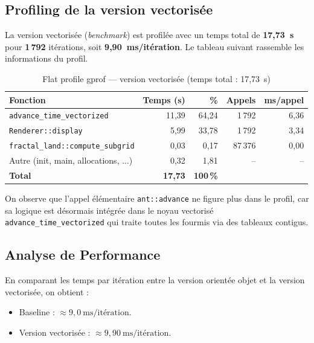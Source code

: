 \documentclass[12pt,a4paper]{article}
\begin{document}
\subsection{Profiling de la version vectorisée}

La version vectorisée (\textit{benchmark}) est profilée avec un temps total de \textbf{17,73~s} pour \textbf{1\,792} itérations, soit \textbf{9,90~ms/itération}. Le tableau suivant rassemble les informations du profil.

\begin{table}[H]
    \centering
    \caption{Flat profile gprof --- version vectorisée (temps total : 17,73~s)}
    \begin{tabular}{lrrrr}
        \toprule
        \textbf{Fonction} & \textbf{Temps (s)} & \textbf{\%} & \textbf{Appels} & \textbf{ms/appel} \\
        \midrule
        \texttt{advance\_time\_vectorized} & 11{,}39 & 64{,}24 & 1\,792 & 6{,}36 \\
        \texttt{Renderer::display} & 5{,}99 & 33{,}78 & 1\,792 & 3{,}34 \\
        \texttt{fractal\_land::compute\_subgrid} & 0{,}03 & 0{,}17 & 87\,376 & 0{,}00 \\
        Autre (init, main, allocations, ...) & 0{,}32 & 1{,}81 & -- & -- \\
        \midrule
        \textbf{Total} & \textbf{17{,}73} & \textbf{100\,\%} & & \\
        \bottomrule
    \end{tabular}
\end{table}

On observe que l'appel élémentaire \texttt{ant::advance} ne figure plus dans le profil, car sa logique est désormais intégrée dans le noyau vectorisé \texttt{advance\_time\_vectorized} qui traite toutes les fourmis via des tableaux contigus.

\subsection{Analyse de Performance}

En comparant les temps par itération entre la version orientée objet et la version vectorisée, on obtient :
\begin{itemize}
    \item Baseline : \(\approx 9,0~\text{ms/itération}\).
    \item Version vectorisée : \(\approx 9,90~\text{ms/itération}\).
\end{itemize}
\end{document}
